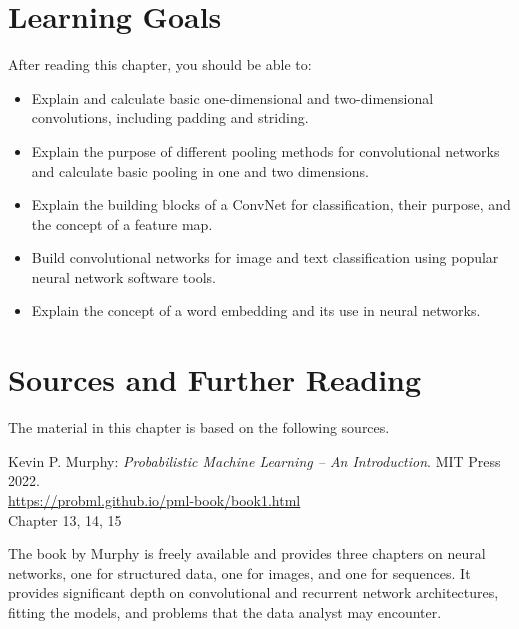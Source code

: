%
%
\section*{Learning Goals}

After reading this chapter, you should be able to:
\begin{itemize}
   \item Explain and calculate basic one-dimensional and two-dimensional convolutions, including padding and striding.
   \item Explain the purpose of different pooling methods for convolutional networks and calculate basic pooling in one and two dimensions.
   \item Explain the building blocks of a ConvNet for classification, their purpose, and the concept of a feature map.
   \item  Build convolutional networks for image and text classification using popular neural network software tools.
   \item Explain the concept of a word embedding and its use in neural networks.
\end{itemize}

\section*{Sources and Further Reading}

The material in this chapter is based on the following sources. 

\begin{tcolorbox}[colback=alert]
Kevin P. Murphy: \emph{Probabilistic Machine Learning -- An Introduction}. MIT Press 2022. \\

\url{https://probml.github.io/pml-book/book1.html} \\

Chapter 13, 14, 15

\end{tcolorbox}

The book by Murphy is freely available and provides three chapters on neural networks, one for structured data, one for images, and one for sequences. It provides significant depth on convolutional and recurrent network architectures, fitting the models, and problems that the data analyst may encounter. 

